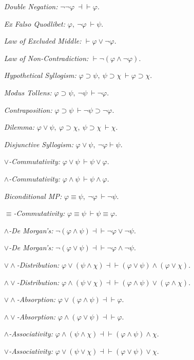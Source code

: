 \documentclass[a4paper, 11pt]{article} %
\begin{document}
\begin{multicols}{2}
\begin{enumerate}[leftmargin=1.5in]
  \item[\it Double Negation:] $\neg\neg\varphi\ \dashv\vdash \varphi$.
  \item[\it Ex Falso Quodlibet:] $\varphi,\ \neg\varphi\ \vdash \psi$.
  \item[\it Law of Excluded Middle:] $\vdash \varphi\vee\neg\varphi$.
  \item[\it Law of Non-Contradiction:] $\vdash \neg(\varphi\wedge\neg\varphi)$.
  \item[\it Hypothetical Syllogism:] $\varphi \supset \psi,\ \psi \supset \chi\ \vdash \varphi \supset \chi$.
  \item[\it Modus Tollens:] $\varphi \supset \psi,\ \neg\psi\ \vdash \neg\varphi$.
  \item[\it Contraposition:] $\varphi \supset \psi\ \vdash \neg\psi \supset \neg\varphi$.
  \item[\it Dilemma:] $\varphi \vee \psi,\ \varphi \supset \chi,\ \psi \supset \chi\ \vdash \chi$.
  \item[\it Disjunctive Syllogism:] $\varphi \vee \psi,\ \neg \varphi \vdash \psi$.
  \item[\it $\vee$-Commutativity:] $\varphi \vee \psi\ \vdash \psi \vee \varphi$.
  \item[\it $\wedge$-Commutativity:] $\varphi \wedge \psi\ \vdash \psi \wedge \varphi$.
  \item[\it Biconditional MP:] $\varphi \equiv \psi,\ \neg\varphi\ \vdash \neg\psi$.
  \item[\it $\equiv$-Commutativity:] $\varphi \equiv \psi\ \vdash \psi \equiv \varphi$.
  \item[\it $\wedge$-De Morgan's:] $\neg(\varphi\wedge\psi)\dashv\vdash\neg\varphi\vee\neg\psi$.
  \item[\it $\vee$-De Morgan's:] $\neg(\varphi\vee\psi)\dashv\vdash\neg\varphi\wedge\neg\psi$.
  \item[\it ${\vee}{\wedge}$-Distribution:] $\varphi\vee(\psi\wedge\chi) \dashv\vdash (\varphi\vee\psi)\wedge(\varphi\vee\chi)$.
  \item[\it ${\wedge}{\vee}$-Distribution:] $\varphi\wedge(\psi\vee\chi) \dashv\vdash (\varphi\wedge\psi)\vee(\varphi\wedge\chi)$.
  \item[\it ${\vee}{\wedge}$-Absorption:] $\varphi\vee(\varphi\wedge\psi) \dashv\vdash \varphi$.
  \item[\it ${\wedge}{\vee}$-Absorption:] $\varphi\wedge(\varphi\vee\psi) \dashv\vdash \varphi$.
  \item[\it $\wedge$-Associativity:] $\varphi\wedge(\psi\wedge\chi) \dashv\vdash (\varphi\wedge\psi)\wedge\chi$.
  \item[\it $\vee$-Associativity:] $\varphi\vee(\psi\vee\chi) \dashv\vdash (\varphi\vee\psi)\vee\chi$.
\end{enumerate}





\end{multicols}
\end{document}

